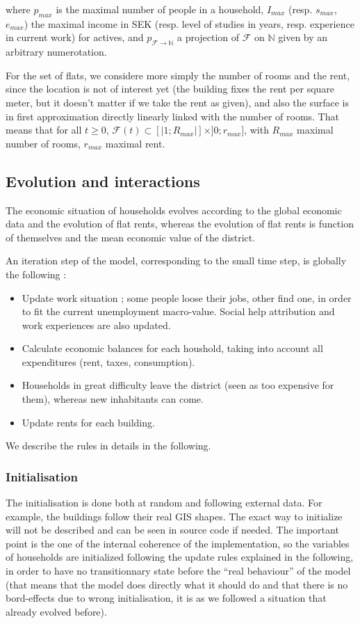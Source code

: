 \documentclass[english]{article}
\begin{document}
where $p_{max}$ is the maximal number of people in a household, $I_{max}$
(resp. $s_{max}$, $e_{max}$) the maximal income in SEK (resp. level
of studies in years, resp. experience in current work) for actives,
and $p_{\mathcal{F}\rightarrow\mathbb{N}}$ a projection of $\mathcal{F}$
on $\mathbb{N}$ given by an arbitrary numerotation.

For the set of flats, we considere more simply the number of rooms
and the rent, since the location is not of interest yet (the building
fixes the rent per square meter, but it doesn't matter if we take
the rent as given), and also the surface is in first approximation
directly linearly linked with the number of rooms. That means that
for all $t\geq0$, $\mathcal{F}(t)\subset\left[\left|1;R_{max}\right|\right]\times]0;r_{max}]$,
with $R_{max}$ maximal number of rooms, $r_{max}$ maximal rent.


\subsection{Evolution and interactions}

The economic situation of households evolves according to the global
economic data and the evolution of flat rents, whereas the evolution
of flat rents is function of themselves and the mean economic value
of the district.

An iteration step of the model, corresponding to the small time step,
is globally the following :
\begin{itemize}
\item Update work situation ; some people loose their jobs, other find one,
in order to fit the current unemployment macro-value. Social help
attribution and work experiences are also updated.
\item Calculate economic balances for each houshold, taking into account
all expenditures (rent, taxes, consumption).
\item Households in great difficulty leave the district (seen as too expensive
for them), whereas new inhabitants can come.
\item Update rents for each building.
\end{itemize}
We describe the rules in details in the following.


\subsubsection{Initialisation}

The initialisation is done both at random and following external data.
For example, the buildings follow their real GIS shapes. The exact
way to initialize will not be described and can be seen in source
code if needed. The important point is the one of the internal coherence
of the implementation, so the variables of households are initialized
following the update rules explained in the following, in order to
have no transitionnary state before the ``real behaviour'' of the
model (that means that the model does directly what it should do and
that there is no bord-effects due to wrong initialisation, it is as
we followed a situation that already evolved before).
\end{document}
